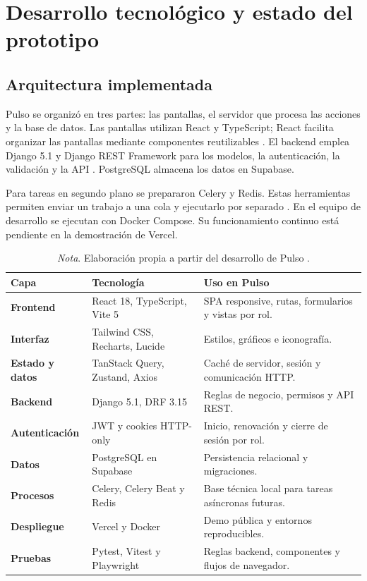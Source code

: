 \section{Desarrollo tecnológico y estado del prototipo}

\subsection{Arquitectura implementada}

Pulso se organizó en tres partes: las pantallas, el servidor que procesa las
acciones y la base de datos. Las pantallas utilizan React y
TypeScript; React facilita organizar las pantallas mediante componentes
reutilizables \parencite{react2026}. El backend emplea Django 5.1 y Django REST
Framework para los modelos, la autenticación, la validación y la API
\parencite{django51,drf315}. PostgreSQL almacena los datos en Supabase.

Para tareas en segundo plano se prepararon Celery y Redis. Estas herramientas
permiten enviar un trabajo a una cola y ejecutarlo por separado
\parencite{celery2026}. En el equipo de desarrollo se ejecutan con Docker
Compose. Su funcionamiento continuo está pendiente en la demostración de Vercel.

\begin{table}[htbp]
\caption{Tecnologías utilizadas en Pulso}
\begin{tabularx}{\textwidth}{>{\bfseries}p{3cm}p{4cm}X}
\toprule
Capa & Tecnología & Uso en Pulso \\
\midrule
Frontend & React 18, TypeScript, Vite 5 & SPA responsive, rutas, formularios y vistas por rol. \\
Interfaz & Tailwind CSS, Recharts, Lucide & Estilos, gráficos e iconografía. \\
Estado y datos & TanStack Query, Zustand, Axios & Caché de servidor, sesión y comunicación HTTP. \\
Backend & Django 5.1, DRF 3.15 & Reglas de negocio, permisos y API REST. \\
Autenticación & JWT y cookies HTTP-only & Inicio, renovación y cierre de sesión por rol. \\
Datos & PostgreSQL en Supabase & Persistencia relacional y migraciones. \\
Procesos & Celery, Celery Beat y Redis & Base técnica local para tareas asíncronas futuras. \\
Despliegue & Vercel y Docker & Demo pública y entornos reproducibles. \\
Pruebas & Pytest, Vitest y Playwright & Reglas backend, componentes y flujos de navegador. \\
\bottomrule
\end{tabularx}
\caption*{\textit{Nota}. Elaboración propia a partir del desarrollo de Pulso \parencite{gymhub_repo}.}
\end{table}

